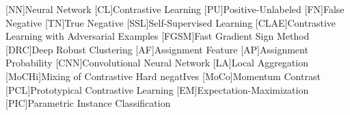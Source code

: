 \begin{acronym}

    [NN]{Neural Network}
    [CL]{Contrastive Learning}
    [PU]{Positive-Unlabeled}
    [FN]{False Negative}
    [TN]{True Negative}
    [SSL]{Self-Supervised Learning}
    [CLAE]{Contrastive Learning with Adversarial Examples}
    [FGSM]{Fast Gradient Sign Method}
    [DRC]{Deep Robust Clustering}
    [AF]{Assignment Feature}
    [AP]{Assignment Probability}
    [CNN]{Convolutional Neural Network}
    [LA]{Local Aggregation}
    [MoCHi]{Mixing of Contrastive Hard negatIves}
    [MoCo]{Momentum Contrast}
    [PCL]{Prototypical Contrastive Learning}
    [EM]{Expectation-Maximization}
    [PIC]{Parametric Instance Classification}


\end{acronym}